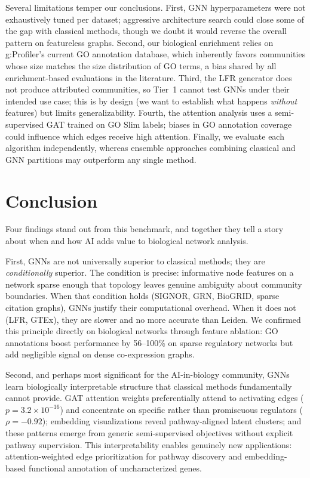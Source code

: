 \documentclass[11pt]{article}
\begin{document}
Several limitations temper our conclusions.
First, GNN hyperparameters were not exhaustively tuned per dataset; aggressive architecture search could close some of the gap with classical methods, though we doubt it would reverse the overall pattern on featureless graphs.
Second, our biological enrichment relies on g:Profiler's current GO annotation database, which inherently favors communities whose size matches the size distribution of GO terms, a bias shared by all enrichment-based evaluations in the literature.
Third, the LFR generator does not produce attributed communities, so Tier~1 cannot test GNNs under their intended use case; this is by design (we want to establish what happens \emph{without} features) but limits generalizability.
Fourth, the attention analysis uses a semi-supervised GAT trained on GO Slim labels; biases in GO annotation coverage could influence which edges receive high attention.
Finally, we evaluate each algorithm independently, whereas ensemble approaches combining classical and GNN partitions may outperform any single method.


\section{Conclusion}
\label{sec:conclusion}

Four findings stand out from this benchmark, and together they tell a story about when and how AI adds value to biological network analysis.

First, GNNs are not universally superior to classical methods; they are \emph{conditionally} superior.
The condition is precise: informative node features on a network sparse enough that topology leaves genuine ambiguity about community boundaries.
When that condition holds (SIGNOR, GRN, BioGRID, sparse citation graphs), GNNs justify their computational overhead.
When it does not (LFR, GTEx), they are slower and no more accurate than Leiden.
We confirmed this principle directly on biological networks through feature ablation: GO annotations boost performance by 56--100\% on sparse regulatory networks but add negligible signal on dense co-expression graphs.

Second, and perhaps most significant for the AI-in-biology community, GNNs learn biologically interpretable structure that classical methods fundamentally cannot provide.
GAT attention weights preferentially attend to activating edges ($p = 3.2 \times 10^{-16}$) and concentrate on specific rather than promiscuous regulators ($\rho = -0.92$); embedding visualizations reveal pathway-aligned latent clusters; and these patterns emerge from generic semi-supervised objectives without explicit pathway supervision.
This interpretability enables genuinely new applications: attention-weighted edge prioritization for pathway discovery and embedding-based functional annotation of uncharacterized genes.
\end{document}
